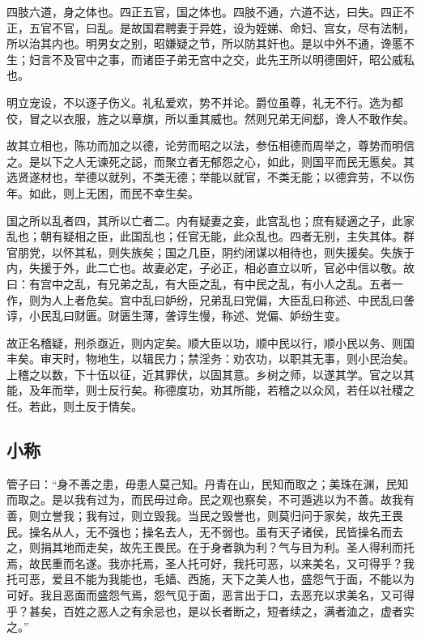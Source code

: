 \documentclass[]{article}
\begin{document}
四肢六道，身之体也。四正五官，国之体也。四肢不通，六道不达，曰失。四正不正，五官不官，曰乱。是故国君聘妻于异姓，设为姪娣、命妇、宫女，尽有法制，所以治其内也。明男女之别，昭嫌疑之节，所以防其奸也。是以中外不通，谗慝不生；妇言不及官中之事，而诸臣子弟无宫中之交，此先王所以明德圉奸，昭公威私也。

明立宠设，不以逐子伤义。礼私爱欢，势不并论。爵位虽尊，礼无不行。选为都佼，冒之以衣服，旌之以章旗，所以重其威也。然则兄弟无间郄，谗人不敢作矣。

故其立相也，陈功而加之以德，论劳而昭之以法，参伍相德而周举之，尊势而明信之。是以下之人无谏死之誋，而聚立者无郁怨之心，如此，则国平而民无慝矣。其选贤遂材也，举德以就列，不类无德；举能以就官，不类无能；以德弇劳，不以伤年。如此，则上无困，而民不幸生矣。

国之所以乱者四，其所以亡者二。内有疑妻之妾，此宫乱也；庶有疑適之子，此家乱也；朝有疑相之臣，此国乱也；任官无能，此众乱也。四者无别，主失其体。群官朋党，以怀其私，则失族矣；国之几臣，阴约闭谋以相待也，则失援矣。失族于内，失援于外，此二亡也。故妻必定，子必正，相必直立以听，官必中信以敬。故曰：有宫中之乱，有兄弟之乱，有大臣之乱，有中民之乱，有小人之乱。五者一作，则为人上者危矣。宫中乱曰妒纷，兄弟乱曰党偏，大臣乱曰称述、中民乱曰詟谆，小民乱曰财匮。财匮生薄，詟谆生慢，称述、党偏、妒纷生变。

故正名稽疑，刑杀亟近，则内定矣。顺大臣以功，顺中民以行，顺小民以务、则国丰矣。审天时，物地生，以辑民力；禁淫务：劝农功，以职其无事，则小民治矣。上稽之以数，下十伍以征，近其罪伏，以固其意。乡树之师，以遂其学。官之以其能，及年而举，则士反行矣。称德度功，劝其所能，若稽之以众风，若任以社稷之任。若此，则土反于情矣。

\hypertarget{header-n440}{%
\subsection{小称}\label{header-n440}}

管子曰：``身不善之患，毋患人莫己知。丹青在山，民知而取之；美珠在渊，民知而取之。是以我有过为，而民毋过命。民之观也察矣，不可遁逃以为不善。故我有善，则立誉我；我有过，则立毁我。当民之毁誉也，则莫归问于家矣，故先王畏民。操名从人，无不强也；操名去人，无不弱也。虽有天子诸侯，民皆操名而去之，则捐其地而走矣，故先王畏民。在于身者孰为利？气与目为利。圣人得利而托焉，故民重而名遂。我亦托焉，圣人托可好，我托可恶，以来美名，又可得乎？我托可恶，爱且不能为我能也，毛嫱、西施，天下之美人也，盛怨气于面，不能以为可好。我且恶面而盛怨气焉，怨气见于面，恶言出于口，去恶充以求美名，又可得乎？甚矣，百姓之恶人之有余忌也，是以长者断之，短者续之，满者洫之，虚者实之。''
\end{document}
